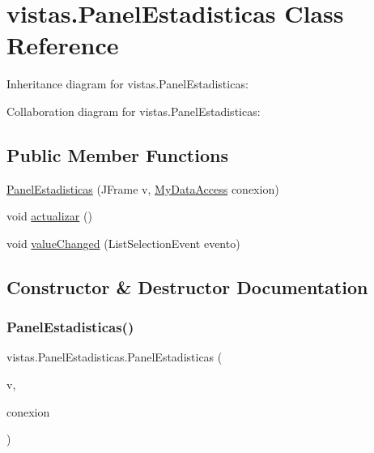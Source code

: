 \hypertarget{classvistas_1_1_panel_estadisticas}{}\section{vistas.\+Panel\+Estadisticas Class Reference}
\label{classvistas_1_1_panel_estadisticas}


Inheritance diagram for vistas.\+Panel\+Estadisticas\+:


Collaboration diagram for vistas.\+Panel\+Estadisticas\+:
\subsection*{Public Member Functions}
\begin{DoxyCompactItemize}
\item 
\mbox{\hyperlink{classvistas_1_1_panel_estadisticas_a6b1628d4f2e0f5bf58d694e345895ed7}{Panel\+Estadisticas}} (J\+Frame v, \mbox{\hyperlink{classconexion_s_q_l_1_1_my_data_access}{My\+Data\+Access}} conexion)
\item 
void \mbox{\hyperlink{classvistas_1_1_panel_estadisticas_a3daac089d3c88691869b45d9c0961b30}{actualizar}} ()
\item 
void \mbox{\hyperlink{classvistas_1_1_panel_estadisticas_ad053d06b278eae5f7f54af0476ca0461}{value\+Changed}} (List\+Selection\+Event evento)
\end{DoxyCompactItemize}


\subsection{Constructor \& Destructor Documentation}
\mbox{\label{classvistas_1_1_panel_estadisticas_a6b1628d4f2e0f5bf58d694e345895ed7}} 
\subsubsection{\texorpdfstring{Panel\+Estadisticas()}{PanelEstadisticas()}}
{\footnotesize\ttfamily vistas.\+Panel\+Estadisticas.\+Panel\+Estadisticas (\begin{DoxyParamCaption}\item[{J\+Frame}]{v,  }\item[{\mbox{\hyperlink{classconexion_s_q_l_1_1_my_data_access}{My\+Data\+Access}}}]{conexion }\end{DoxyParamCaption})\hspace{0.3cm}{\ttfamily [inline]}}

